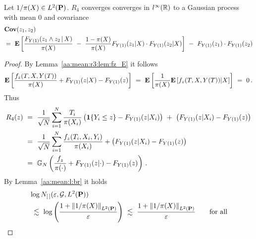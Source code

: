 \begin{lemma}
  \label{aa:mean:l:r4}
  Let
  $1/\pi(X)\in L^2(\P)$.
  $R_4$ converges
  converges in
  $l^\infty(\R)$
  to a Gaussian process with mean 0 and covariance
\begin{align*}
  &
  \mathbf{Cov}
  (z_1,z_2)
  \\
  &
  =\ 
  \E
  \left[ 
 \frac{
 F_{Y(1)}(z_1 \land z_2\,|\,X)
}{\pi(X)}
\ 
-
\ 
 \frac{1-\pi(X)}{\pi(X)}
 F_{Y(1)}(z_1|X)
 \cdot
 F_{Y(1)}(z_2|X)
  \right]
  \ 
 -
 \ 
 F_{Y(1)}(z_1)
 \cdot
 F_{Y(1)}(z_2)
\end{align*}

\end{lemma}
\begin{proof}
  By Lemma~\ref{aa:mean:r3:lem:fz_E} it follows
  \begin{align*}
    \E
    \left[
      \frac{f_z(T,X,Y(T))}{\pi(X)}
      +
      F_{Y(1)}(z|X)
      -
      F_{Y(1)}(z)
      \right]
      \ 
      =
      \ 
      \E
      \left[
      \frac{1}{\pi(X)}
      \E
      \left[
        f_z(T,X,Y(T))
        |X
      \right]
      \right]
      \ 
      =
      \ 
      0
      \,.
  \end{align*}
  Thus
  \begin{align*}
    R_4(z)
    &
  \
  =
  \ 
  \frac{1}{
  \sqrt{N}
  }
    \sum_{i=1}^{N} 
    \frac{T_i}{\pi(X_i)}
    \left( 
    \mathbf{1}{\left\{ Y_i \le z \right\}}
    -
  F_{Y(1)}(z|X_i)
    \right)
    \ 
    +
    \ 
    \left( 
  F_{Y(1)}(z|X_i)
    -
  F_{Y(1)}(z)
    \right)
    \\
    &
    \ 
  =
    \ 
  \frac{1}{
  \sqrt{N}
  }
    \sum_{i=1}^{N} 
      \frac{f_z(T_i,X_i,Y_i)}{\pi(X_i)}
      +
      \left( 
      F_{Y(1)}(z|X_i)
      -
      F_{Y(1)}(z)
      \right)
      \\
      &
      \ 
      =
      \ 
      \G_N 
      \left(
       \frac{f_z}{\pi(\cdot)}
      +
      F_{Y(1)}(z|\cdot)
      -
      F_{Y(1)}(z)
      \right)
      \,.
  \end{align*}
  By Lemma~\ref{aa:mean:l:br}
  it holds
  \begin{align*}
    &
  \log
  N_{[\,]}
    (
    \varepsilon
    ,
    \mathcal{G}, L^2(\P))
    \\
    &
    \ 
    \lesssim
    \ 
    \log
    \left(
      \frac
      {
      1+
    \norm{1/\pi(X)}_{ L^2(\P)}
      }
      {\varepsilon}
    \right)
    \ 
    \lesssim
    \ 
      \frac
      {
      1+
    \norm{1/\pi(X)}_{ L^2(\P)}
      }
      {\varepsilon}
    \qquad
    \text{for all}

\end{align*}
\end{proof}
